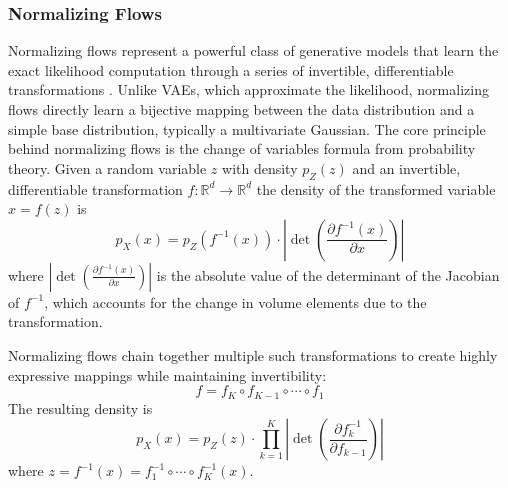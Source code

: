     \subsubsection{Normalizing Flows}
        Normalizing flows represent a powerful class of generative models that learn the exact likelihood computation through a series of invertible, differentiable transformations .
        Unlike VAEs, which approximate the likelihood, normalizing flows directly learn a bijective mapping between the data distribution and a simple base distribution, typically a multivariate Gaussian.
        The core principle behind normalizing flows is the change of variables formula from probability theory.
        Given a random variable \(z\) with density \(p_Z(z)\) and an invertible, differentiable transformation \(f:\mathbb{R}^d \rightarrow \mathbb{R}^d\) the density of the transformed variable \(x = f(z)\) is
        \begin{equation}
            p_X(x) = p_Z(f^{-1}(x)) \cdot \left|\det\left(\frac{\partial f^{-1}(x)}{\partial x}\right)\right|
        \end{equation}
        where \(\left|\det\left(\frac{\partial f^{-1}(x)}{\partial x}\right)\right|\) is the absolute value of the determinant of the Jacobian of \(f^{-1}\), which accounts for the change in volume elements due to the transformation.

        Normalizing flows chain together multiple such transformations to create highly expressive mappings while maintaining invertibility:
        \begin{equation}
            f = f_K \circ f_{K-1} \circ \cdots \circ f_1
        \end{equation}
        The resulting density is
        \begin{equation}
            p_X(x) = p_Z(z) \cdot \prod_{k=1}^{K} \left|\det\left(\frac{\partial f_k^{-1}}{\partial f_{k-1}}\right)\right|
        \end{equation}
        where \(z = f^{-1}(x) = f_1^{-1} \circ \cdots \circ f_K^{-1}(x)\).

